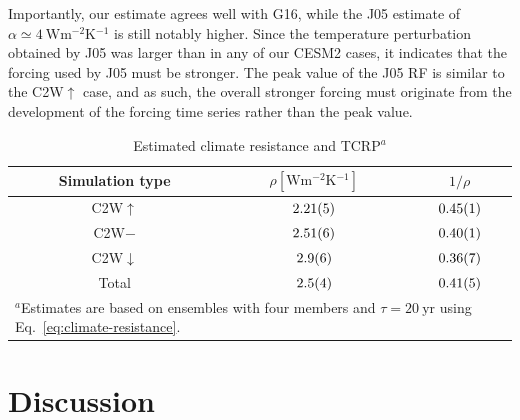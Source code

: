 \documentclass[draft]{agujournal2019}
\begin{document}
Importantly, our estimate agrees well with G16, while the J05 estimate of \(\alpha
\simeq \SI{4}{\watt\metre^{-2}\kelvin^{-1}}\) is still notably higher. Since the
temperature perturbation obtained by J05 was larger than in any of our CESM2 cases, it
indicates that the forcing used by J05 must be stronger. The peak value of the J05 RF is
similar to the C2W\(\uparrow\) case, and as such, the overall stronger forcing must
originate from the development of the forcing time series rather than the peak value.

\begin{table}
  \centering

  \caption{Estimated climate resistance and TCRP\(^{a}\)}\label{tab:trcp}%
  \begin{tabular}{ccc}
    \toprule
    Simulation type   & \(\rho [\si{\watt\metre^{-2}\kelvin^{-1}}]\) & \(1/\rho\)            \\
    \midrule
    C2W\(\uparrow\)   & \(\num{2.21\pm0.05}\)                        & \(\num{0.45\pm0.01}\) \\
    C2W\(-\)          & \(\num{2.51\pm0.06}\)                        & \(\num{0.40\pm0.01}\) \\
    C2W\(\downarrow\) & \(\num{2.9\pm0.6}\)                          & \(\num{0.36\pm0.07}\) \\
    Total             & \(\num{2.5\pm0.4}\)                          & \(\num{0.41\pm0.05}\) \\
    \toprule
    \multicolumn{3}{l}{\parbox{\linewidth}{\(^{a}\)Estimates are based on ensembles with four members and \(\tau
    =\SI{20}{\mathrm{yr}}\) using Eq.~\ref{eq:climate-resistance}.}}                         \\
  \end{tabular}
\end{table}

\section{Discussion}\label{sec:discussion}

\end{document}
